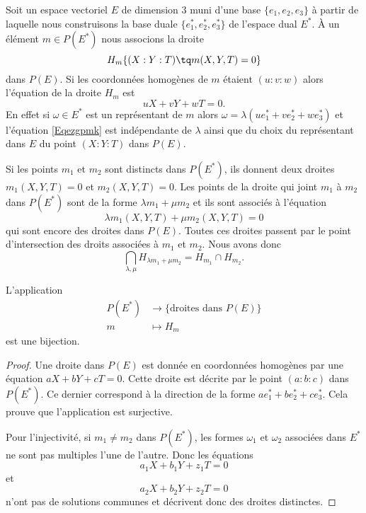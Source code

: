 Soit un espace vectoriel \( E\) de dimension \( 3\) muni d'une base \( \{ e_1,e_2,e_3 \}\) à partir de laquelle nous construisons la base duale \( \{ e_1^*,e_2^*,e_3^* \}\) de l'espace dual \( E^*\). À un élément \( m\in P(E^*)\) nous associons la droite
\begin{equation}
	H_m\{ (X:Y:T)\tq m(X,Y,T)=0 \}
\end{equation}
dans \( P(E)\). Si les coordonnées homogènes de \( m\) étaient \( (u:v:w)\) alors l'équation de la droite \( H_m\) est
\begin{equation}    \label{Eqezgpmk}
	uX+vY+wT=0.
\end{equation}
En effet si \( \omega\in E^*\) est un représentant de \( m\) alors \( \omega=\lambda(ue_1^*+ve_2^*+we_3^*)\) et l'équation \eqref{Eqezgpmk} est indépendante de \( \lambda\) ainsi que du choix du représentant dans \( E\) du point \( (X:Y:T)\) dans \( P(E)\).

Si les points \( m_1\) et \( m_2\) sont distincts dans \( P(E^*)\), ils donnent deux droites \( m_1(X,Y,T)=0\) et \( m_2(X,Y,T)=0\). Les points de la droite qui joint \( m_1\) à \( m_2\) dans \( P(E^*)\) sont de la forme \( \lambda m_1+\mu m_2\) et ils sont associés à l'équation
\begin{equation}
	\lambda m_1(X,Y,T)+\mu m_2(X,Y,T)=0
\end{equation}
qui sont encore des droites dans \( P(E)\). Toutes ces droites passent par le point d'intersection des droits associées à \( m_1\) et \( m_2\). Nous avons donc
\begin{equation}
	\bigcap_{\lambda,\mu}H_{\lambda m_1+\mu m_2}=H_{m_1}\cap H_{m_2}.
\end{equation}

\begin{lemma}
	L'application
	\begin{equation}
		\begin{aligned}
			P(E^*) & \to \{ \text{droites dans } P(E) \} \\
			m      & \mapsto H_m
		\end{aligned}
	\end{equation}
	est une bijection.
\end{lemma}

\begin{proof}
	Une droite dans \( P(E)\) est donnée en coordonnées homogènes par une équation \( aX+bY+cT=0\). Cette droite est décrite par le point \( (a:b:c)\) dans \( P(E^*)\). Ce dernier correspond à la direction de la forme \( ae_1^*+be_2^*+ce_3^*\). Cela prouve que l'application est surjective.

	Pour l'injectivité, si \( m_1\neq m_2\) dans \( P(E^*)\), les formes \( \omega_1\) et \( \omega_2\) associées dans \( E^*\) ne sont pas multiples l'une de l'autre. Donc les équations
	\begin{equation}
		a_1X+b_1Y+z_1T=0
	\end{equation}
	et
	\begin{equation}
		a_2X+b_2Y+z_2T=0
	\end{equation}
	n'ont pas de solutions communes et décrivent donc des droites distinctes.
\end{proof}

